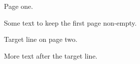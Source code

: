 \documentclass{article}
\begin{document}
Page one.

Some text to keep the first page non-empty.

\newpage

Target line on page two.

More text after the target line.
\end{document}
